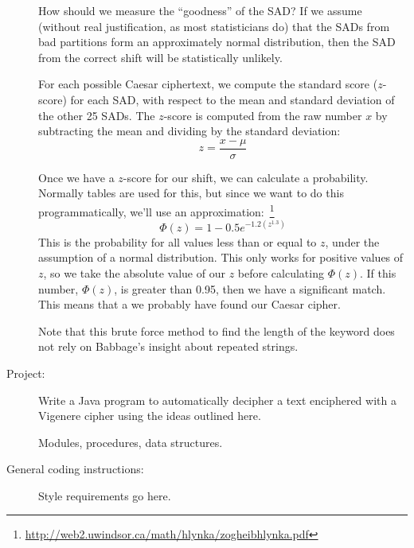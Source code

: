 \documentclass{article}
\begin{document}
\begin{description}
How should we measure the ``goodness'' of the SAD?  If we assume
(without real justification, as most statisticians do) that the SADs
from bad partitions form an approximately normal distribution, then the
SAD from the correct shift will be statistically unlikely.

For each possible Caesar ciphertext, we
compute the standard score ($z$-score) for each SAD, with respect to
the mean and standard deviation of the other 25 SADs.  The $z$-score
is computed from the raw number $x$ by subtracting the mean and
dividing by the standard deviation:
\[
z = \frac{x - \mu}{\sigma}
\]


Once we have a $z$-score for our shift, we can calculate a
probability.  Normally tables are used for this, but since we want to
do this programmatically, we'll use an
approximation:\
\footnote{\url{http://web2.uwindsor.ca/math/hlynka/zogheibhlynka.pdf}}
  \[ \Phi(z) = 1 - 0.5 e^{-1.2(z^{1.3})} \]
This is the probability for all values less than or equal to $z$,
under the assumption of a normal distribution.
This only works for positive values of $z$, so we take the absolute
value of our $z$ before calculating $\Phi(z)$.
If this number, $\Phi(z)$, is greater than 0.95, then we have a
significant match.  This means that a we probably have found our
Caesar cipher.

Note that this brute force method to find the length of the keyword
does not rely on Babbage's insight about repeated strings.  
  

\item[Project:]  Write a Java program to automatically decipher a text
  enciphered with a Vigenere cipher using the ideas outlined here.

  Modules, procedures, data structures.
  
\item[General coding instructions:]  Style requirements go here.

\end{description}
\end{document}
